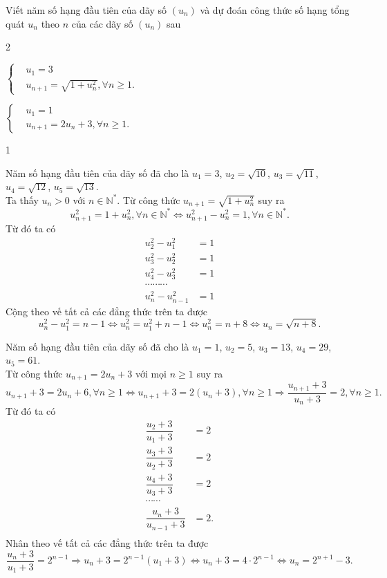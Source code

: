 \begin{baitap}
	Viết năm số hạng đầu tiên của dãy số $(u_n)$ và dự đoán công thức số hạng tổng quát $u_n$ theo $n$ của các dãy số $(u_n)$ sau
	\begin{enumEX}{2}
		\item $\left\{\begin{aligned}&u_1=3 \\&u_{n+1}=\sqrt{1+u_n^2}, \forall n\geq 1.\end{aligned}\right.$	
		\item $\left\{\begin{aligned}&u_1=1 \\&u_{n+1}=2u_n+3, \forall n\geq 1.\end{aligned}\right.$	
	\end{enumEX}
	\loigiai
	{
		\begin{enumEX}{1}
			\item Năm số hạng đầu tiên của dãy số đã cho là $u_1=3$, $u_2=\sqrt{10}$, $u_3=\sqrt{11}$, $u_4=\sqrt{12}$, $u_5=\sqrt{13}$.\\
			Ta thấy $u_n>0$ với $n\in\mathbb{N}^*$. Từ công thức $u_{n+1}=\sqrt{1+u_n^2}$ suy ra
			\[u_{n+1}^2=1+u_n^2, \forall n\in \mathbb{N}^* \Leftrightarrow u_{n+1}^2-u_n^2=1, \forall n\in \mathbb{N}^*.\]
			Từ đó ta có
			\allowdisplaybreaks
			\begin{align*}
				u_2^2-u_1^2 &=1\\
				u_3^2-u_2^2 &=1\\
				u_4^2-u_3^2 &=1\\
				\cdots\cdots\cdots\\
				u_n^2-u_{n-1}^2 &=1
			\end{align*}
			Cộng theo vế tất cả các đẳng thức trên ta được
			\[u_n^2-u_1^2= n-1 \Leftrightarrow u_n^2=u_1^2+n-1 \Leftrightarrow u_n^2=n+8 \Leftrightarrow u_n=\sqrt{n+8}.\]
			\item Năm số hạng đầu tiên của dãy số đã cho là $u_1=1$, $u_2=5$, $u_3=13$, $u_4=29$, $u_5=61$.\\
			Từ công thức $u_{n+1}=2u_n+3$ với mọi $n\geq 1$ suy ra
			\[u_{n+1}+3=2u_n+6, \forall n\geq 1 \Leftrightarrow u_{n+1}+3=2(u_n+3), \forall n\geq 1 \Rightarrow \dfrac{u_{n+1}+3}{u_n+3}=2, \forall n\geq 1.\]
			Từ đó ta có
			\allowdisplaybreaks
			\begin{align*}
				\dfrac{u_2+3}{u_1+3} &=2\\
				\dfrac{u_3+3}{u_2+3} &=2\\
				\dfrac{u_4+3}{u_3+3} &=2\\
				\cdots\cdots\\
				\dfrac{u_n+3}{u_{n-1}+3} &=2.\\
			\end{align*}
			Nhân theo vế tất cả các đẳng thức trên ta được
			\[\dfrac{u_n+3}{u_1+3} = 2^{n-1} \Rightarrow u_n+3=2^{n-1}(u_1+3) \Leftrightarrow u_n+3=4\cdot 2^{n-1} \Leftrightarrow u_n=2^{n+1}-3.\]
		\end{enumEX}
	}
\end{baitap}


